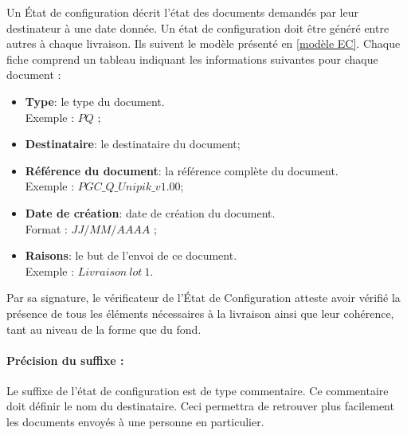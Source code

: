 Un État de configuration décrit l'état des documents demandés par leur destinateur à une date donnée. Un état de configuration doit être généré entre autres à chaque livraison. Ils suivent le modèle présenté en \ref{modèle EC}. Chaque fiche comprend un tableau indiquant les informations suivantes pour chaque document :
\begin{itemize}
	\item \textbf{Type}: le type du document. \\
	Exemple : $PQ$ ;
	\item \textbf{Destinataire}: le destinataire du document;
	\item \textbf{Référence du document}: la référence complète du document. \\
	Exemple : $PGC\_Q\_Unipik\_v1.00$;
	\item \textbf{Date de création}: date de création du document.\\
	Format : $JJ/MM/AAAA$ ;
	\item \textbf{Raisons}: le but de l'envoi de ce document.\\
	Exemple : $Livraison\ lot\ 1$.
\end{itemize}


\bigskip
Par sa signature, le vérificateur de l'État de Configuration atteste avoir vérifié la présence
de tous les éléments nécessaires à la livraison ainsi que leur cohérence, tant au niveau de
la forme que du fond.

\paragraph{Précision du suffixe :}
Le suffixe de l'état de configuration est de type commentaire. Ce commentaire doit définir le nom du destinataire. Ceci permettra de retrouver plus facilement les documents envoyés à une personne en particulier.

